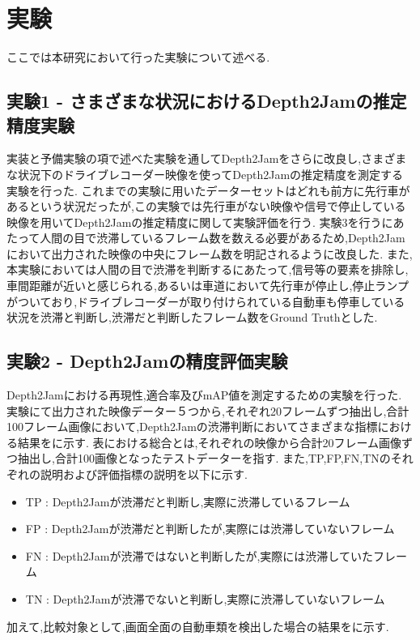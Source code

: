 \chapter{実験}
ここでは本研究において行った実験について述べる.

\section{実験1 - さまざまな状況におけるDepth2Jamの推定精度実験}
\label{sec:exp1}
実装と予備実験の項で述べた実験を通してDepth2Jamをさらに改良し,さまざまな状況下のドライブレコーダー映像を使ってDepth2Jamの推定精度を測定する実験を行った.
これまでの実験に用いたデーターセットはどれも前方に先行車があるという状況だったが,この実験では先行車がない映像や信号で停止している映像を用いてDepth2Jamの推定精度に関して実験評価を行う.
実験3を行うにあたって人間の目で渋滞しているフレーム数を数える必要があるため,Depth2Jamにおいて出力された映像の中央にフレーム数を明記されるように改良した.
また,本実験においては人間の目で渋滞を判断するにあたって,信号等の要素を排除し,車間距離が近いと感じられる,あるいは車道において先行車が停止し,停止ランプがついており,ドライブレコーダーが取り付けられている自動車も停車している状況を渋滞と判断し,渋滞だと判断したフレーム数をGround Truthとした.

\section{実験2 - Depth2Jamの精度評価実験}
\label{sec:exp2}
Depth2Jamにおける再現性,適合率及びmAP値を測定するための実験を行った.
実験にて出力された映像データー５つから,それぞれ20フレームずつ抽出し,合計100フレーム画像において,Depth2Jamの渋滞判断においてさまざまな指標における結果をに示す.
表における総合とは,それぞれの映像から合計20フレーム画像ずつ抽出し,合計100画像となったテストデーターを指す.
また,TP,FP,FN,TNのそれぞれの説明および評価指標の説明を以下に示す.
\begin{itemize}
  \item TP : Depth2Jamが渋滞だと判断し,実際に渋滞しているフレーム
  \item FP : Depth2Jamが渋滞だと判断したが,実際には渋滞していないフレーム
  \item FN : Depth2Jamが渋滞ではないと判断したが,実際には渋滞していたフレーム
  \item TN : Depth2Jamが渋滞でないと判断し,実際に渋滞していないフレーム
\end{itemize}
加えて,比較対象として,画面全面の自動車類を検出した場合の結果をに示す.

